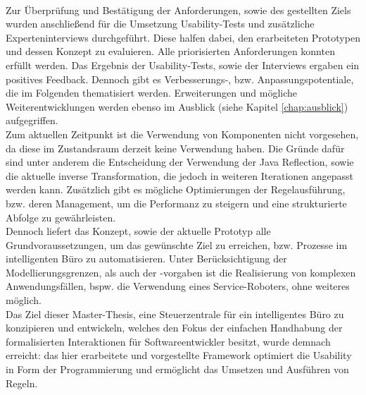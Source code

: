     \\
    \linebreak
    Zur Überprüfung und Bestätigung der Anforderungen, sowie des gestellten Ziels wurden anschließend für die Umsetzung Usability-Tests und zusätzliche 
    Experteninterviews durchgeführt. Diese halfen dabei, den erarbeiteten Prototypen und dessen Konzept zu evaluieren. Alle priorisierten 
    Anforderungen konnten erfüllt werden. Das Ergebnis der Usability-Tests, sowie der Interviews ergaben ein positives Feedback. Dennoch 
    gibt es Verbesserungs-, bzw. Anpassungspotentiale, die im Folgenden thematisiert werden. Erweiterungen und mögliche Weiterentwicklungen werden 
    ebenso im Ausblick (siehe Kapitel \ref{chap:ausblick}) aufgegriffen. 
    \\
    \linebreak 
    Zum aktuellen Zeitpunkt ist die Verwendung von Komponenten nicht vorgesehen, da diese im Zustandsraum derzeit keine Verwendung haben. Die 
    Gründe dafür sind unter anderem die Entscheidung der Verwendung der Java Reflection, sowie die aktuelle inverse Transformation, die jedoch in weiteren 
    Iterationen angepasst werden kann. Zusätzlich gibt es mögliche Optimierungen der Regelausführung, bzw. deren Management, um die Performanz 
    zu steigern und eine strukturierte Abfolge zu gewährleisten.  
    \\
    Dennoch liefert das Konzept, sowie der aktuelle Prototyp alle Grundvoraussetzungen, um das gewünschte Ziel zu 
    erreichen, bzw. Prozesse im intelligenten Büro zu automatisieren. Unter Berücksichtigung der Modellierungsgrenzen, als 
    auch der -vorgaben ist die Realisierung von komplexen Anwendungsfällen, bspw. die Verwendung eines 
    Service-Roboters, ohne weiteres möglich. 
    \\
    \linebreak
    Das Ziel dieser Master-Thesis, eine Steuerzentrale für ein intelligentes Büro zu konzipieren und entwickeln, welches den Fokus der 
    einfachen Handhabung der formalisierten Interaktionen für Softwareentwickler besitzt, wurde demnach erreicht: das hier erarbeitete 
    und vorgestellte Framework optimiert die Usability in Form der Programmierung und ermöglicht das Umsetzen und Ausführen von Regeln. 
